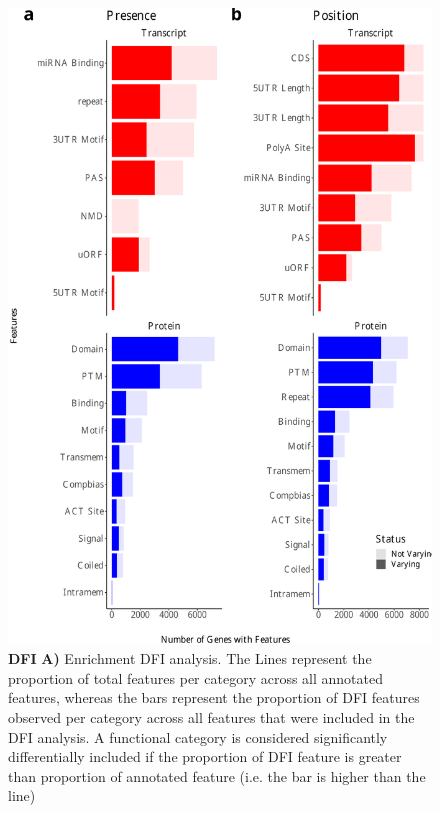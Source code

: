 \begin{figure}[!htp]
	\centering
	\includegraphics[page=3,trim={0cm 20cm 0cm 0cm},scale = 0.6]{Figures/WholeFDA.pdf}
	\captionsetup{width=0.95\textwidth}
	\caption[DFI]%
	{\textbf{DFI} \textbf{A)} Enrichment DFI analysis. The Lines represent the proportion of total features per category across all annotated features, whereas the bars represent the proportion of DFI features observed per category across all features that were included in the DFI analysis. A functional category is considered significantly differentially included if the proportion of DFI feature is greater than proportion of annotated feature (i.e. the bar is higher than the line)}   
	\label{fig:DFI}
\end{figure}

\clearpage 
   
